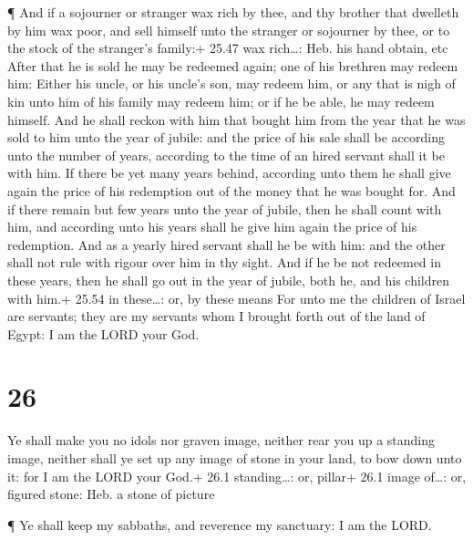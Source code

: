  ¶ And if a sojourner or stranger wax rich by thee, and thy
brother that dwelleth by him wax poor, and sell himself unto the
stranger or sojourner by thee, or to the stock of the stranger's
family:+ 25.47 wax rich\ldots: Heb. his hand obtain, etc 
After that he is sold he may be redeemed again; one of his brethren may
redeem him:  Either his uncle, or his uncle's son, may
redeem him, or any that is nigh of kin unto him of his family may redeem
him; or if he be able, he may redeem himself.  And he shall
reckon with him that bought him from the year that he was sold to him
unto the year of jubile: and the price of his sale shall be according
unto the number of years, according to the time of an hired servant
shall it be with him.  If there be yet many years behind,
according unto them he shall give again the price of his redemption out
of the money that he was bought for.  And if there remain
but few years unto the year of jubile, then he shall count with him, and
according unto his years shall he give him again the price of his
redemption.  And as a yearly hired servant shall he be with
him: and the other shall not rule with rigour over him in thy sight.
 And if he be not redeemed in these years, then he shall go
out in the year of jubile, both he, and his children with him.+ 25.54 in
these\ldots: or, by these means  For unto me the children
of Israel are servants; they are my servants whom I brought forth out of
the land of Egypt: I am the LORD your God.

\hypertarget{section-25}{%
\section{26}\label{section-25}}

 Ye shall make you no idols nor graven image, neither rear
you up a standing image, neither shall ye set up any image of stone in
your land, to bow down unto it: for I am the LORD your God.+ 26.1
standing\ldots: or, pillar+ 26.1 image of\ldots: or, figured stone: Heb.
a stone of picture

 ¶ Ye shall keep my sabbaths, and reverence my sanctuary: I
am the LORD.

